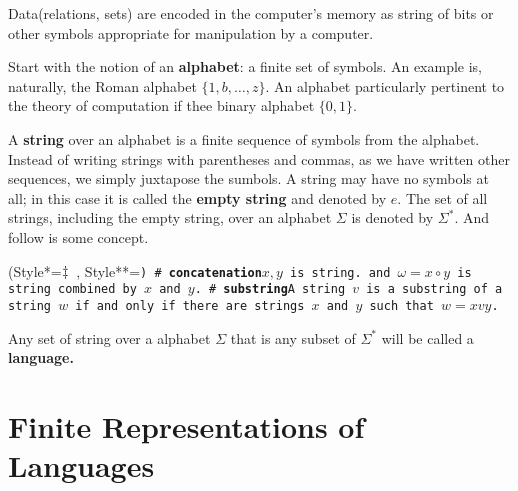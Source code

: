 Data(relations, sets) are encoded in the computer's memory as string of bits
or other symbols appropriate for manipulation by a computer.

Start with the notion of an {\bf alphabet}: a finite set of symbols.
An example is, naturally, the Roman alphabet $\{1, b,\ldots, z\}$. An
alphabet particularly pertinent to the theory of computation if thee binary alphabet 
$\{0,1\}$.

A {\bf string} over an alphabet is a finite sequence of symbols from the
alphabet. Instead of writing strings with parentheses and commas, as we have
written other sequences, we simply juxtapose the sumbols.
A string may have no symbols at all; in this case it is called the 
{\bf empty string} and denoted by $e$.
The set of all strings, including the empty string, over an alphabet $\Sigma$ is 
denoted by $\Sigma^\ast$. And follow is some concept.

\begin{easylist}[checklist]
\ListProperties(Style*=$\ddagger\hskip.5em$, Style**=\tt)
# {\bf concatenation}\quad $x, y$ is string. and $\omega = x\circ y$ is string combined by $x$ and $y$.
# {\bf substring}\quad A string $v$ is a substring of a string $w$ if and only if there are strings
$x$ and $y$ such that $w = xvy$.
\end{easylist}

Any set of string over a alphabet $\Sigma$ that is any subset of $\Sigma^\ast$ will be called
a {\bf language.}


\section{Finite Representations of Languages}
